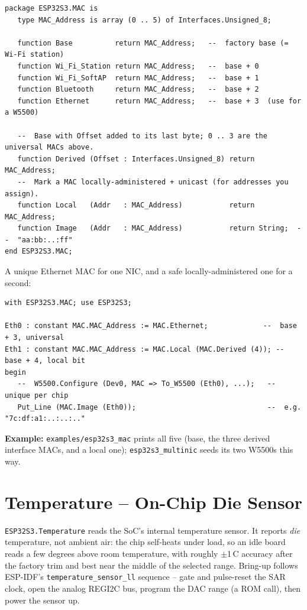 \begin{lstlisting}
package ESP32S3.MAC is
   type MAC_Address is array (0 .. 5) of Interfaces.Unsigned_8;

   function Base          return MAC_Address;   --  factory base (= Wi-Fi station)
   function Wi_Fi_Station return MAC_Address;   --  base + 0
   function Wi_Fi_SoftAP  return MAC_Address;   --  base + 1
   function Bluetooth     return MAC_Address;   --  base + 2
   function Ethernet      return MAC_Address;   --  base + 3  (use for a W5500)

   --  Base with Offset added to its last byte; 0 .. 3 are the universal MACs above.
   function Derived (Offset : Interfaces.Unsigned_8) return MAC_Address;
   --  Mark a MAC locally-administered + unicast (for addresses you assign).
   function Local   (Addr   : MAC_Address)           return MAC_Address;
   function Image   (Addr   : MAC_Address)           return String;  --  "aa:bb:..:ff"
end ESP32S3.MAC;
\end{lstlisting}

A unique Ethernet MAC for one NIC, and a safe locally-administered one for a second:

\begin{lstlisting}
with ESP32S3.MAC; use ESP32S3;

Eth0 : constant MAC.MAC_Address := MAC.Ethernet;             --  base + 3, universal
Eth1 : constant MAC.MAC_Address := MAC.Local (MAC.Derived (4)); -- base + 4, local bit
begin
   --  W5500.Configure (Dev0, MAC => To_W5500 (Eth0), ...);   --  unique per chip
   Put_Line (MAC.Image (Eth0));                               --  e.g. "7c:df:a1:..:..:.."
\end{lstlisting}

\noindent\textbf{Example:} \texttt{examples/esp32s3\_mac} prints all five (base, the
three derived interface MACs, and a local one); \texttt{esp32s3\_multinic} seeds its
two W5500s this way.

\section{Temperature -- On-Chip Die Sensor}
\label{app:int:temperature}

\texttt{ESP32S3.Temperature} reads the SoC's internal temperature sensor. It
reports \emph{die} temperature, not ambient air: the chip self-heats under load,
so an idle board reads a few degrees above room temperature, with roughly
$\pm$1\,\textdegree C accuracy after the factory trim and best near the middle of
the selected range. Bring-up follows ESP-IDF's \texttt{temperature\_sensor\_ll}
sequence -- gate and pulse-reset the SAR clock, open the analog REGI2C bus,
program the DAC range (a ROM call), then power the sensor up.

